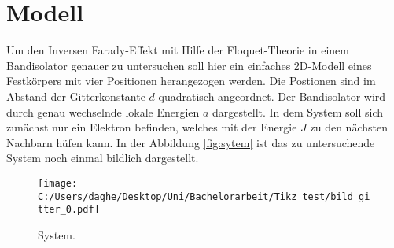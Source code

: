 \chapter{Modell}
Um den Inversen Farady-Effekt mit Hilfe der Floquet-Theorie in
einem Bandisolator genauer zu untersuchen soll hier ein einfaches 2D-Modell
eines Festkörpers mit vier Positionen herangezogen werden.
Die Postionen sind im Abstand der Gitterkonstante $d$ quadratisch angeordnet.
Der Bandisolator wird durch
genau wechselnde lokale Energien $a$ dargestellt.
In dem System soll sich zunächst nur ein Elektron befinden, welches mit der Energie
$J$ zu den nächsten Nachbarn hüfen kann.
In der Abbildung \ref{fig:sytem}
ist das zu untersuchende System noch einmal bildlich dargestellt.

\begin{figure}
   \centering
   \texttt{[image: C:/Users/daghe/Desktop/Uni/Bachelorarbeit/Tikz\_test/bild\_gitter\_0.pdf]}
   \caption{System.}
   \label{fig:system}
\end{figure}

